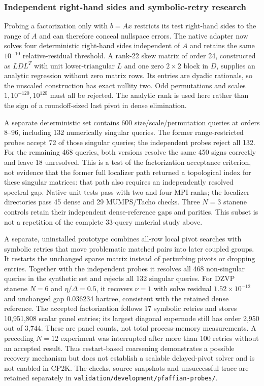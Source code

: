 \documentclass[11pt]{article}
\begin{document}
\subsubsection{Independent right-hand sides and symbolic-retry research}
Probing a factorization only with $b=Ax$ restricts its test
right-hand sides to the range of $A$ and can therefore conceal
nullspace errors. The native adapter now solves four deterministic
right-hand sides independent of $A$ and retains the same
$10^{-10}$ relative-residual threshold. A rank-22 skew matrix of
order 24, constructed as $LDL^T$ with unit lower-triangular $L$
and one zero $2\times2$ block in $D$, supplies an analytic
regression without zero matrix rows. Its entries are dyadic
rationals, so the unscaled construction has exact nullity two.
Odd permutations and scales $1,10^{-120},10^{120}$ must all be
rejected. The analytic rank is used here rather than the sign
of a roundoff-sized last pivot in dense elimination.

A separate deterministic set contains 600 size/scale/permutation
queries at orders 8--96, including 132 numerically singular
queries. The former range-restricted probes accept 72 of those
singular queries; the independent probes reject all 132.
For the remaining 468 queries, both versions resolve the same
450 signs correctly and leave 18 unresolved. This is a test of
the factorization acceptance criterion, not evidence that the
former full localizer path returned a topological index for these
singular matrices: that path also requires an independently
resolved spectral gap. Native unit tests pass with two and four
MPI ranks; the localizer directories pass 45 dense and 29
MUMPS/Tacho checks. Three $N=3$ stanene controls retain their
independent dense-reference gaps and parities. This subset is
not a repetition of the complete 33-query material study above.

A separate, uninstalled prototype combines all-row local pivot
searches with symbolic retries that move problematic matched
pairs into later coupled groups. It restarts the unchanged sparse
matrix instead of perturbing pivots or dropping entries.
Together with the independent probes it resolves all 468
non-singular queries in the synthetic set and rejects all 132
singular queries. For DZVP stanene $N=6$ and
$\eta/\Delta=0.5$, it recovers $\nu=1$ with solve residual
$1.52\times10^{-12}$ and unchanged gap 0.036234 hartree,
consistent with the retained dense reference. The accepted
factorization follows 17 symbolic retries and stores 10,951,808
scalar panel entries; its largest diagonal supernode still has
order 2,950 out of 3,744. These are panel counts, not total
process-memory measurements. A preceding $N=12$ experiment was
interrupted after more than 100 retries without an accepted
result. Thus restart-based coarsening demonstrates a possible
recovery mechanism but does not establish a scalable delayed-pivot
solver and is not enabled in CP2K. The checks, source snapshots
and unsuccessful trace are retained separately in
\nolinkurl{validation/development/pfaffian-probes/}.
\end{document}
